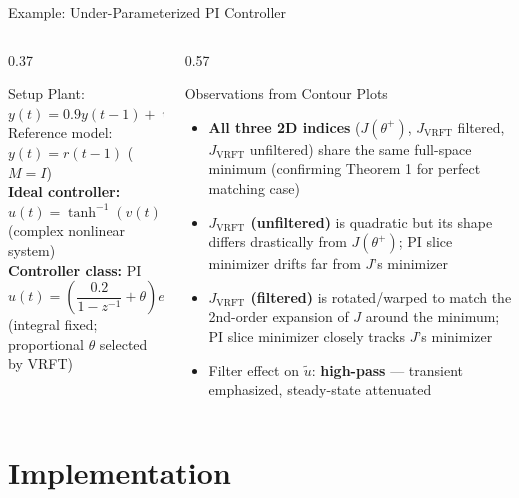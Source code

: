 \documentclass[hyperref={pdfpagemode=FullScreen},aspectratio=169]{beamer}
\newcommand{\highlight}[1]{{\color{accentgreen!70!black}\textbf{#1}}}
\newcommand{\JJ}{J_{\mathrm{VRFT}}}
\begin{document}
\begin{frame}{Example: Under-Parameterized PI Controller}
  \begin{columns}[T]
    \begin{column}{0.37\textwidth}
      \begin{exampleblock}{Setup}
        \small
        Plant: $y(t) = 0.9y(t-1) + \tanh(u(t-1))$\\
        Reference model: $y(t) = r(t-1)$ ($M = I$)\\[0.3em]
        \textbf{Ideal controller:}
        $u(t) = \tanh^{-1}(v(t))$ (complex nonlinear system)\\[0.3em]
        \textbf{Controller class:} PI
        \[
          u(t) = \left(\frac{0.2}{1-z^{-1}} + \theta\right)e(t)
        \]
        (integral fixed; proportional $\theta$ selected by VRFT)
      \end{exampleblock}
    \end{column}
    \begin{column}{0.57\textwidth}
      \begin{block}{Observations from Contour Plots}
        \begin{itemize}
          \item \textbf{All three 2D indices} ($J(\theta^+)$, $\JJ$ filtered, $\JJ$ unfiltered) share the same full-space minimum (confirming Theorem 1 for perfect matching case)
          \item \textbf{$\JJ$ (unfiltered)} is quadratic but its shape differs drastically from $J(\theta^+)$; PI slice minimizer drifts far from $J$'s minimizer
          \item \textbf{$\JJ$ (filtered)} is rotated/warped to match the 2nd-order expansion of $J$ around the minimum; PI slice minimizer closely tracks $J$'s minimizer
          \item Filter effect on $\tilde{u}$: \highlight{high-pass} --- transient emphasized, steady-state attenuated
        \end{itemize}
      \end{block}
    \end{column}
  \end{columns}
\end{frame}

\section{Implementation}
\end{document}
